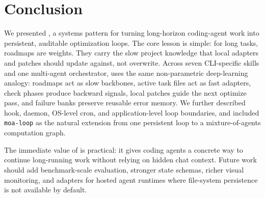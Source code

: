 \section{Conclusion}

We presented \systemname{}, a systems pattern for turning long-horizon coding-agent work into persistent, auditable optimization loops. The core lesson is simple: for long tasks, roadmaps are weights. They carry the slow project knowledge that local adapters and patches should update against, not overwrite. Across seven CLI-specific skills and one multi-agent orchestrator, \ours{} uses the same non-parametric deep-learning analogy: roadmaps act as slow backbones, active task files act as fast adapters, check phases produce backward signals, local patches guide the next optimize pass, and failure banks preserve reusable error memory. We further described hook, daemon, OS-level cron, and application-level loop boundaries, and included \texttt{moa-loop} as the natural extension from one persistent loop to a mixture-of-agents computation graph.

The immediate value of \ours{} is practical: it gives coding agents a concrete way to continue long-running work without relying on hidden chat context. Future work should add benchmark-scale evaluation, stronger state schemas, richer visual monitoring, and adapters for hosted agent runtimes where file-system persistence is not available by default.
